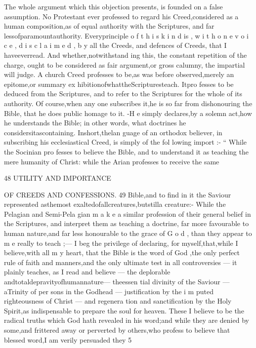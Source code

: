 \documentclass[
]{book}
\begin{document}
The whole argument which this objection presents, is founded on a false assumption. No Protestant ever professed to regard his Creed,considered as a human composition,as of equal authority with the Scriptures, and far
lessofparamountauthority. Everyprinciple o f t h i s k i n d is , w i t h o n e v o i c e , d i s c l a i m e d , b y
all the Creeds, and defences of Creeds, that I
haveeverread. And whether,notwithstand
ing this, the constant repetition of the charge, ought to be considered as fair argument,or
gross calumny, the impartial will judge. A church Creed professes to be,as was before observed,merely an epitome,or summary ex hibitionofwhattheScripturesteach. Itpro fesses to be deduced from the Scriptures, and
to refer to the Scriptures for the whole of its authority. Of course,when any one subscribes it,he is so far from dishonouring the Bible, that he does public homage to it. -H e simply declares,by a solemn act,how he understands
the Bible; in other words, what doctrines he
considersitascontaining. Inshort,thelan
guage of an orthodox believer, in subscribing
his ecclesiastical Creed, is simply of the fol
lowing import :- `` While the Socinian pro fesses to believe the Bible, and to understand
it as teaching the mere humanity of Christ: while the Arian professes to receive the same

48 UTILITY AND IMPORTANCE

OF CREEDS AND CONFESSIONS. 49
Bible,and to find in it the Saviour represented asthemost exaltedofallcreatures,butstilla creature:- While the Pelagian and Semi-Pela gian m a k e a similar profession of their general belief in the Scriptures, and interpret them as teaching a doctrine, far more favourable to human nature,and far less honourable to the grace of G o d , than they appear to m e really to teach ;--- I beg the privilege of declaring, for
myself,that,while I believe,with all m y heart, that the Bible is the word of God ,the only
perfect rule of faith and manners,and the only ultimate test in all controversies --- it plainly
teaches, as I read and believe --- the deplorable andtotaldepravityofhumannature--- theessen tial divinity of the Saviour --- aTrinity of per sons in the Godhead --- justification by the i m puted righteousness of Christ --- and regenera tion and sanctification by the Holy Spirit,as indispensable to prepare the soul for heaven. These I believe to be the radical truths which God hath revealed in his word;and while they are denied by some,and frittered away
or perverted by others,who profess to believe that blessed word,I am verily persuaded they
5
\end{document}

